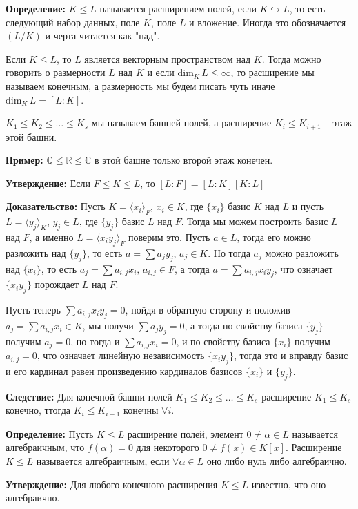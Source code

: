 \documentclass[a4paper, 12pt]{book}
\begin{document}
\textbf{Определение:} $K\leq L$ называется расширением полей, если $K
\hookrightarrow L$, то есть следующий набор данных, поле $K$, поле $L$ и
вложение. Иногда это обозначается $(L/K)$ и черта читается как "над".

Если $K\leq L$, то $L$ является векторным пространством над $K$. Тогда можно
говорить о размерности $L$ над $K$ и если $\text{dim}_K\,L\le\infty$, то
расширение мы называем конечным, а размерность мы будем писать чуть иначе
$\text{dim}_K\,L=[L:K]$.

$K_1\le K_2\le\ldots\le K_s$ мы называем башней полей, а расширение $K_i\le
K_{i+1}$ – этаж этой башни.

\textbf{Пример:} $\mathbb{Q}\le\mathbb{R}\le\mathbb{C}$ в этой башне только
второй этаж конечен.

\textbf{Утверждение:} Если $F\le K\le L$, то $[L:F]=[L:K][K:L]$

\textbf{Доказательство:} Пусть $K=\langle x_i\rangle_F,\,x_i\in K$, где
$\{x_i\}$ базис $K$ над $L$ и пусть $L=\langle y_j\rangle_K,\,y_j\in L$, где
$\{y_j\}$ базис $L$ над $F$. Тогда мы можем построить базис $L$ над $F$, а
именно $L=\langle x_iy_j \rangle_F$ поверим это. Пусть $a\in L$, тогда его
можно разложить над $\{y_j\}$, то есть $a=\sum a_jy_j,\,a_j\in K$. Но тогда
$a_j$ можно разложить над $\{x_i\}$, то есть $a_j=\sum a_{i,j}x_i,\,a_{i,j}\in
F$, а тогда $a=\sum a_{i,j}x_iy_j$, что означает $\{x_iy_j\}$ порождает $L$ над
$F$.

Пусть теперь $\sum a_{i,j}x_iy_j=0$, пойдя в обратную сторону и положив $a_j=
\sum a_{i,j}x_i\in K$, мы получи $\sum a_jy_j=0$, а тогда по свойству базиса
$\{y_j\}$ получим $a_j=0$, но тогда и $\sum a_{i,j}x_i=0$, и по свойству базиса
$\{x_i\}$ получим $a_{i,j}=0$, что означает линейную независимость $\{x_iy_j\}$,
тогда это и вправду базис и его кардинал равен произведению кардиналов базисов
$\{x_i\}$ и $\{y_j\}$.

\textbf{Следствие:} Для конечной башни полей $K_1\le K_2\le\ldots\le K_s$
расширение $K_1\le K_s$ конечно, ттогда $K_i\le K_{i+1}$ конечны $\forall i$.

\textbf{Определение:} Пусть $K\le L$ расширение полей, элемент $0\neq\alpha\in
L$ называется алгебраичным, что $f(\alpha)=0$ для некоторого $0\neq f(x)\in K[x]$.
Расширение $K\le L$ называется алгебраичным, если $\forall\alpha\in L$ оно либо
нуль либо алгебраично.

\textbf{Утверждение:} Для любого конечного расширения $K\le L$ известно, что
оно алгебраично.
\end{document}
